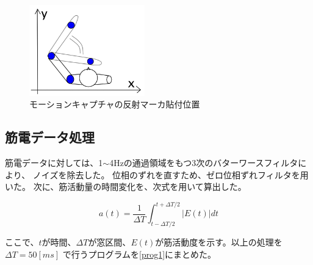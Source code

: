 \documentclass{jsarticle}
\begin{document}

\begin{figure}[htb]
  \begin{center}
    \includegraphics[width=5cm]{karada.png}
    \caption{モーションキャプチャの反射マーカ貼付位置}
    \label{karada2}
  \end{center}
\end{figure}


\subsection{筋電データ処理}
筋電データに対しては、1$\sim$4Hzの通過領域をもつ3次のバターワースフィルタにより、
ノイズを除去した。
位相のずれを直すため、ゼロ位相ずれフィルタを用いた。
次に、筋活動量の時間変化を、次式を用いて算出した。

\begin{equation*}
  a(t)=\frac{1}{\Delta T}\int_{t-\Delta T/2}^{t+\Delta T/2}|E(t)|dt 
\end{equation*}

ここで、$t$が時間、$\Delta T$が窓区間、$E(t)$が筋活動度を示す。以上の処理を$\Delta T= 50 [ms]$ で行うプログラムを\ref{prog1}にまとめた。
\end{document}
